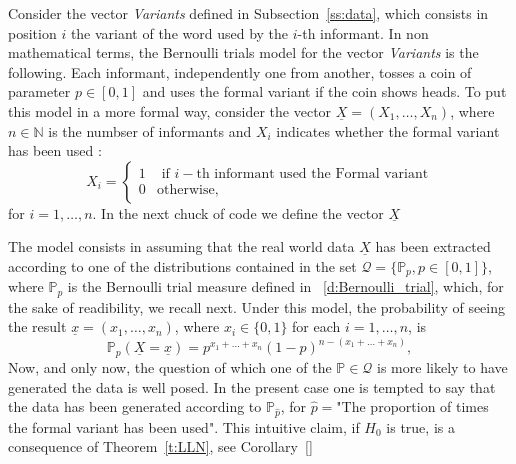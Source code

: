 	\begin{example}
		\label{ex:Bernoulli_model}
		Consider the vector \textit{ Variants } defined in Subsection~\ref{ss:data}, which consists in position $i$ the variant of the word used by the $i$-th informant. In non mathematical terms, the Bernoulli trials model for the vector \textit{ Variants} is the following. Each informant, independently one from another, tosses a coin of parameter $p \in [0,1]$ and uses the formal variant if the coin shows heads.
		To put this model in a more formal way, consider the vector $\underline X = (X_1, \ldots , X_n)$, where $n \in \mathbb N$ is the numbser of informants and $X_i$ indicates whether the formal variant has been used :   
	\begin{equation}
		\label{e:Bernoulli}
		X_i = \begin{cases}
			1 & \text{ if $i-$th informant used the Formal variant}\\
			0 & \text{otherwise},
			\end{cases}
		\end{equation}
for $i = 1, \ldots, n$. In the next chuck of code we define the vector $\underline X$ 
\begin{knitrout}
\color{fgcolor}\begin{kframe}
\begin{alltt}
 \hlkwb{=}  \hlopt{==} \hldef{)}
\hldef{Varian_numeric[}\hlopt{:}\hldef{]}
\end{alltt}


{\ttfamily\noindent\bfseries\color{errorcolor}{\#\# Error: oggetto 'Varian\_numeric' non trovato}}\end{kframe}
\end{knitrout}
The model consists in assuming that the real world data $\underline X$ has been extracted according to one of the distributions contained in the set $\mathcal Q = \{\mathbb P_p, p \in [0,1]\}$, where $\mathbb P_p$ is the Bernoulli trial measure defined in ~\ref{d:Bernoulli_trial}, which, for the sake of readibility, we recall next. 
Under this model, the probability of seeing the result $\underline x = (x_1, \ldots, x_n)$, where $x_{i} \in \{0,1\}$ for each $i =1,\ldots, n$,  is
\begin{equation}
	\label{e:Bernoulli1}
	\mathbb P_p( \underline X = \underline x ) =  p^{ x_1 + \ldots + x_n }(1-p )^{n - (x_1 + \ldots + x_n )}, 
\end{equation}
	Now, and only now, the question of which one of the $\mathbb P \in \mathcal Q $ is more likely to have generated the data is well posed. In the present case one is tempted to say that the data has been generated according to $\mathbb P_{\hat p}$, for $\hat p=$"The proportion of times the formal variant has been used". This intuitive claim, if $H_0$ is true, is a consequence of Theorem~\ref{t:LLN}, see Corollary~\ref{} 


\end{example}
